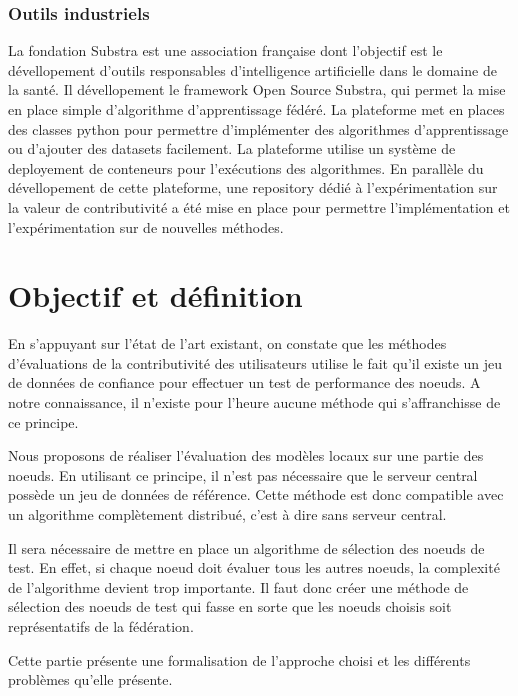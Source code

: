 \documentclass[stage3a]{tnreport} %
\begin{document}
\subsubsection{Outils industriels} \label{substra}


La fondation Substra est une association française dont l'objectif est le dévellopement d'outils responsables d'intelligence artificielle dans le domaine de la santé. Il dévellopement le framework Open Source Substra, qui permet la mise en place simple d'algorithme d'apprentissage fédéré. La plateforme met en places des classes python pour permettre d'implémenter des algorithmes d'apprentissage ou d'ajouter des datasets facilement. La plateforme utilise un système de deployement de conteneurs pour l'exécutions des algorithmes. En parallèle du dévellopement de cette plateforme, une repository dédié à l'expérimentation sur la valeur de contributivité a été mise en place pour permettre l'implémentation et l'expérimentation sur de nouvelles méthodes.



\cleardoublepage

\section{Objectif et définition}

En s'appuyant sur l'état de l'art existant, on constate que les méthodes d'évaluations de la contributivité des utilisateurs utilise le fait qu'il existe un jeu de données de confiance pour effectuer un test de performance des noeuds. A notre connaissance, il n'existe pour l'heure aucune méthode qui s'affranchisse de ce principe. 


Nous proposons de réaliser l'évaluation des modèles locaux sur une partie des noeuds. En utilisant ce principe, il n'est pas nécessaire que le serveur central possède un jeu de données de référence. Cette méthode est donc compatible avec un algorithme complètement distribué, c'est à dire sans serveur central.

 Il sera nécessaire de mettre en place un algorithme de sélection des noeuds de test. En effet, si chaque noeud doit évaluer tous les autres noeuds, la complexité de l'algorithme devient trop importante. Il faut donc créer une méthode de sélection des noeuds de test qui fasse en sorte que les noeuds choisis soit représentatifs de la fédération.
 
 Cette partie présente une formalisation de l'approche choisi et les différents problèmes qu'elle présente.
\end{document}
